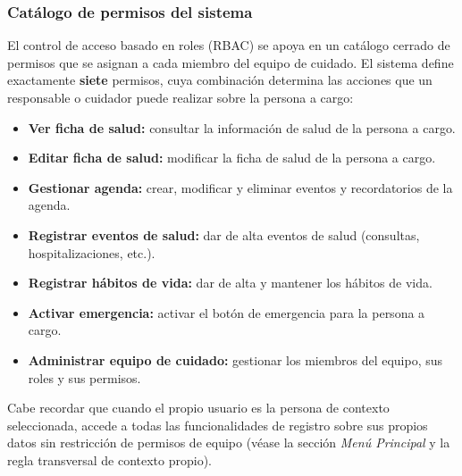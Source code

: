 \documentclass[a4paper,12pt]{article}
\begin{document}
    \subsubsection{Catálogo de permisos del sistema}
    \par El control de acceso basado en roles (RBAC) se apoya en un catálogo cerrado de permisos que se asignan a cada miembro del equipo de cuidado. El sistema define exactamente \textbf{siete} permisos, cuya combinación determina las acciones que un responsable o cuidador puede realizar sobre la persona a cargo:
    \begin{itemize}
        \item \textbf{Ver ficha de salud:} consultar la información de salud de la persona a cargo.
        \item \textbf{Editar ficha de salud:} modificar la ficha de salud de la persona a cargo.
        \item \textbf{Gestionar agenda:} crear, modificar y eliminar eventos y recordatorios de la agenda.
        \item \textbf{Registrar eventos de salud:} dar de alta eventos de salud (consultas, hospitalizaciones, etc.).
        \item \textbf{Registrar hábitos de vida:} dar de alta y mantener los hábitos de vida.
        \item \textbf{Activar emergencia:} activar el botón de emergencia para la persona a cargo.
        \item \textbf{Administrar equipo de cuidado:} gestionar los miembros del equipo, sus roles y sus permisos.
    \end{itemize}
    \par Cabe recordar que cuando el propio usuario es la persona de contexto seleccionada, accede a todas las funcionalidades de registro sobre sus propios datos sin restricción de permisos de equipo (véase la sección \textit{Menú Principal} y la regla transversal de contexto propio).
\end{document}
